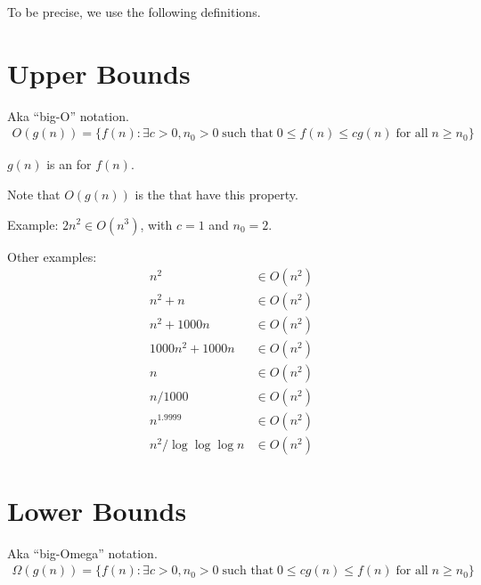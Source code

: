 \documentclass[a4paper]{report}
\newcommand{\bookref}[3]{\marginpar{\faBook{}~#1\\Chapter #2\\Section #3}}
\theoremstyle{definition}
\begin{document}
To be precise, we use the following definitions.

\section{Upper Bounds}
\bookref{CLRS}{3}{3.1}
Aka ``big-O'' notation.
\begin{align*}
O(g(n)) = \{ f(n) : \exists c > 0, n_0 > 0 \;\text{such that}\; 0 \leq f(n) \leq cg(n) \;\text{for all}\; n \geq n_0\}
\end{align*}

$g(n)$ is an  for $f(n)$.

Note that $O(g(n))$ is the  that have this property.

Example: $2n^2 \in O(n^3)$, with $c = 1$ and $n_0 = 2$.
\begin{center}
\end{center}

Other examples:
\begin{align*}
n^2 &\in O(n^2)\\
n^2+n &\in O(n^2)\\
n^2+1000n &\in O(n^2)\\
1000n^2+1000n &\in O(n^2)\\
n &\in O(n^2)\\
n/1000 &\in O(n^2)\\
n^{1.9999} &\in O(n^2)\\
n^2/\log{\log{\log n}} &\in O(n^2)
\end{align*}

\section{Lower Bounds}
\bookref{CLRS}{3}{3.1}
Aka ``big-Omega'' notation.
\begin{align*}
\Omega(g(n)) = \{ f(n) : \exists c > 0, n_0 > 0 \;\text{such that}\; 0 \leq cg(n) \leq f(n) \;\text{for all}\; n \geq n_0\}
\end{align*}
\end{document}
